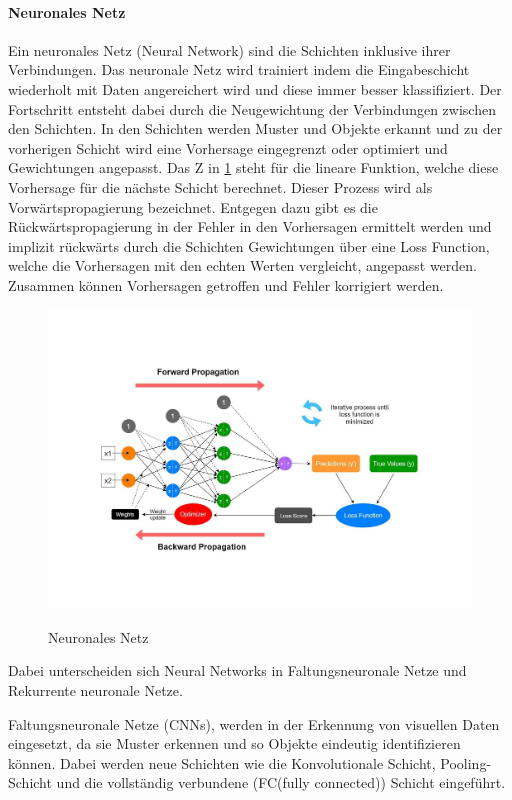 \paragraph{Neuronales Netz}
Ein neuronales Netz (Neural Network) sind die Schichten inklusive ihrer Verbindungen.
Das neuronale Netz wird trainiert indem die Eingabeschicht 
wiederholt mit Daten angereichert wird und diese immer besser klassifiziert.
Der Fortschritt entsteht dabei durch die Neugewichtung der Verbindungen 
zwischen den Schichten. 
In den Schichten werden Muster und Objekte erkannt und zu der vorherigen Schicht
wird eine Vorhersage eingegrenzt oder optimiert 
und Gewichtungen angepasst. 
Das Z in \ref{fig:NN} steht für die lineare Funktion, 
welche diese Vorhersage für die nächste Schicht berechnet.
Dieser Prozess wird als 
Vorwärtspropagierung bezeichnet. 
Entgegen dazu gibt es die Rückwärtspropagierung 
in der Fehler in den Vorhersagen ermittelt werden 
und implizit rückwärts durch die Schichten 
Gewichtungen über eine Loss Function, 
welche die Vorhersagen mit den echten Werten vergleicht, 
angepasst werden. 
Zusammen können Vorhersagen getroffen und Fehler korrigiert werden.
\begin{figure}[htb]
    \centering
    \includegraphics[width=\textwidth]{img/NeuralNetwork.pdf}\\
    \caption{ Neuronales Netz \cite{pramodithaOverviewNeuralNetwork2022a}}\label{fig:NN}
\end{figure}

  
Dabei unterscheiden sich Neural Networks in 
Faltungsneuronale Netze und Rekurrente neuronale Netze.

Faltungsneuronale Netze (CNNs), 
werden in der Erkennung von visuellen Daten eingesetzt, 
da sie Muster erkennen und so Objekte eindeutig identifizieren können.
Dabei werden neue Schichten wie die Konvolutionale Schicht, Pooling-Schicht und
die vollständig verbundene (FC(fully connected)) Schicht eingeführt. 
\cite{WasSindKonvolutionale2021}

